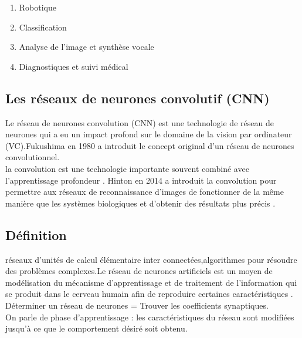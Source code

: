 \documentclass[12pt]{report}
\begin{document}
\begin{enumerate}
\item Robotique
\item Classification
\item Analyse de l'image et synthèse vocale
\item Diagnostiques et suivi médical

\end{enumerate}
 



\subsection{Les réseaux de neurones convolutif (CNN)}
Le réseau de neurones convolution (CNN) est une technologie de réseau de neurones qui a eu un impact profond sur le domaine de la vision par ordinateur (VC).Fukushima en 1980 a introduit le concept original d'un réseau de neurones convolutionnel. \\
la convolution est une technologie importante souvent combiné avec l'apprentissage profondeur \cite{ref13} . Hinton en 2014 a introduit la convolution pour permettre aux réseaux de reconnaissance d'images de fonctionner de la même manière que les systèmes biologiques et d'obtenir des résultats plus précis \cite{ref13} .\\
\newpage
\subsection{Définition}
réseaux d'unités de calcul élémentaire inter connectées,algorithmes pour résoudre des problèmes complexes.Le réseau de neurones artificiels est un moyen de modélisation du mécanisme d'apprentissage et de traitement de l'information qui se produit dans le cerveau humain afin de reproduire certaines caractéristiques \cite{ref13}   .\\
Déterminer un réseau de neurones = Trouver les coefficients synaptiques.\\
On parle de phase d'apprentissage : les caractéristiques du réseau sont modifiées jusqu'à ce que le comportement désiré soit obtenu.
\end{document}
